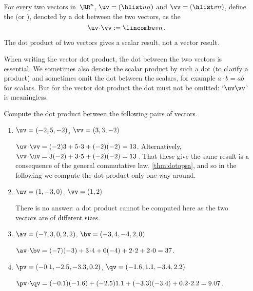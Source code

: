 \begin{definition} \label{def:dotprod}
For every two vectors in~\(\RR^n\), $\uv=(\hlist un)$ and $\vv=(\hlist vn)$,
define the  (or ), denoted by a dot between the two vectors, as the 
\begin{equation*}
\uv\cdot \vv:= \lincomb uvn\,.
\end{equation*}
\end{definition}

The dot product of two vectors gives a scalar result, not a vector result.

When writing the vector dot product, the dot between the two vectors is essential.
We sometimes also denote the scalar product by such a dot (to clarify a product) and sometimes omit the dot between the scalars, for example \(a\cdot b=ab\) for scalars. 
But for the vector dot product the dot must not be omitted: `\(\uv\vv\)' is meaningless.


\begin{example} \label{eg:}
Compute the dot product between the following pairs of vectors.
\begin{enumerate}
\item \(\uv=(-2,5,-2)\), \(\vv=(3,3,-2)\)
\begin{solution} 
\(\uv\cdot\vv=(-2)3+5\cdot3+(-2)(-2)=13\). 
Alternatively, \(\vv\cdot\uv=3(-2)+3\cdot5+(-2)(-2)=13\)\,.
That these give the same result is a consequence of the general commutative law, \autoref{thm:dotopsa}, and so in the following we compute the dot product only one way around.
\end{solution}

\item \(\uv=(1,-3,0)\), \(\vv=(1,2)\)
\begin{solution} 
There is no answer: a dot product cannot be computed here as the two vectors are of different sizes. 
\end{solution}

\item \(\av=(-7,3,0,2,2)\), \(\bv=(-3,4,-4,2,0)\)
\begin{solution} 
\(\av\cdot\bv=(-7)(-3)+3\cdot4+0(-4)+2\cdot2+2\cdot0=37\). 
\end{solution}

\item \(\pv=(-0.1,-2.5,-3.3,0.2)\), \(\qv=(-1.6,1.1,-3.4,2.2)\)
\begin{solution} 
\(\pv\cdot\qv=(-0.1)(-1.6)+(-2.5)1.1+(-3.3)(-3.4)+0.2\cdot2.2=9.07\).
\end{solution}
\end{enumerate}
\end{example}



